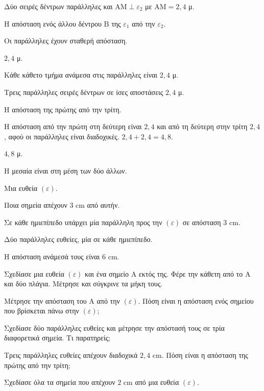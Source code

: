 \tixero Δύο σειρές δέντρων παράλληλες και $\mathrm{ΑΜ}\perp\varepsilon_2$ με $\mathrm{ΑΜ}=2{,}4$ μ.\par
\tithelo Η απόσταση ενός άλλου δέντρου $\mathrm{Β}$ της $\varepsilon_1$ από την $\varepsilon_2$.\par
\possindeo Οι παράλληλες έχουν σταθερή απόσταση.\par
\apantisi $2{,}4$ μ.\par
\elegxos Κάθε κάθετο τμήμα ανάμεσα στις παράλληλες είναι $2{,}4$ μ.

\tixero Τρεις παράλληλες σειρές δέντρων σε ίσες αποστάσεις $2{,}4$ μ.\par
\tithelo Η απόσταση της πρώτης από την τρίτη.\par
\possindeo Η απόσταση από την πρώτη στη δεύτερη είναι $2{,}4$ και από τη δεύτερη στην τρίτη $2{,}4$, αφού οι παράλληλες είναι διαδοχικές. $2{,}4+2{,}4=4{,}8$.\par
\apantisi $4{,}8$ μ.\par
\elegxos Η μεσαία είναι στη μέση των δύο άλλων.

\tixero Μια ευθεία $(\varepsilon)$.\par
\tithelo Ποια σημεία απέχουν $3$ cm από αυτήν.\par
\possindeo Σε κάθε ημιεπίπεδο υπάρχει μία παράλληλη προς την $(\varepsilon)$ σε απόσταση $3$ cm.\par
\apantisi Δύο παράλληλες ευθείες, μία σε κάθε ημιεπίπεδο.\par
\elegxos Η απόσταση ανάμεσά τους είναι $6$ cm.



\ex Σχεδίασε μια ευθεία $(\varepsilon)$ και ένα σημείο $\mathrm{Α}$ εκτός της. Φέρε την κάθετη από το $\mathrm{Α}$ και δύο πλάγια. Μέτρησε και σύγκρινε τα μήκη τους.

\ex Μέτρησε την απόσταση του $\mathrm{Α}$ από την $(\varepsilon)$. Πόση είναι η απόσταση ενός σημείου που βρίσκεται πάνω στην $(\varepsilon)$;

\ex Σχεδίασε δύο παράλληλες ευθείες και μέτρησε την απόστασή τους σε τρία διαφορετικά σημεία. Τι παρατηρείς;

\ex Τρεις παράλληλες ευθείες απέχουν διαδοχικά $2{,}4$ cm. Πόση είναι η απόσταση της πρώτης από την τρίτη;

\ex Σχεδίασε όλα τα σημεία που απέχουν $2$ cm από μια ευθεία $(\varepsilon)$.

